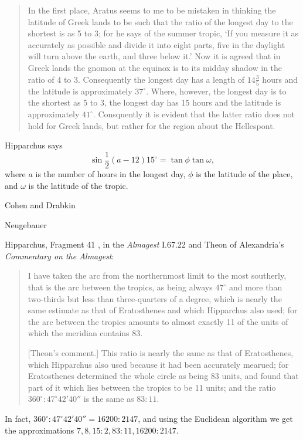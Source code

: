 \documentclass{amsart}
\theoremstyle{definition}
\begin{document}
\begin{quote}
In the first place, Aratus seems to me to be mistaken in thinking the latitude of Greek lands to be such that
the ratio of the longest day to the shortest is as 5 to 3; for he says of the summer tropic, `If you measure it as accurately
as possible and divide it into eight parts, five in the daylight will turn above the earth, and three below it.' Now it is
agreed that in Greek lands the gnomon at the equinox is to its midday shadow in the ratio of 4 to 3. Consequently the 
longest day has a length of $14 \frac{3}{5}$ hours and the latitude is approximately $37^\circ$. Where, however,
the longest day is to the shortest as 5 to 3, the longest day has 15 hours and the latitude is approximately $41^\circ$.
Consquently it is evident that the latter ratio does not hold for Greek lands, but rather for the region about the
Hellespont.
\end{quote} 


Hipparchus says
\[
\sin \frac{1}{2}(a-12) 15^\circ = \tan \phi \tan \omega,
\]
where $a$ is the number of hours in the longest day, $\phi$ is the latitude of the place, and $\omega$
is the latitude of the tropic.

Cohen and Drabkin \cite[pp.~82--86]{drabkin}


Neugebauer \cite{HAMA}

Hipparchus, Fragment 41 \cite[p.~91]{dicks}, in the {\em Almagest} I.67.22 and Theon of Alexandria's
{\em Commentary on the Almagest}:

\begin{quote}
I have taken the arc from the northernmost limit to the most southerly, that is the arc between the tropics, as being always $47^\circ$ and more than two-thirds
but less than three-quarters of a degree, which is nearly the same estimate as that of Eratosthenes and which Hipparchus also used; for the arc between the tropics
amounts to almost exactly 11 of the units of which the meridian contains 83.

[Theon's comment.] This ratio is nearly the same as that of Eratosthenes, which Hipparchus also used because it had been accurately mearued; for Eratosthenes determined
the whole circle as being 83 units, and found that part of it which lies between the tropics to be 11 units; and the ratio $360^\circ: 47^\circ 42' 40''$ is the same as $83:11$.
\end{quote}

In fact, $360^\circ: 47^\circ 42' 40'' = 16200:2147$, and using the Euclidean algorithm we get the approximations $7,8,15:2,
83:11,16200:2147$. 
\end{document}
